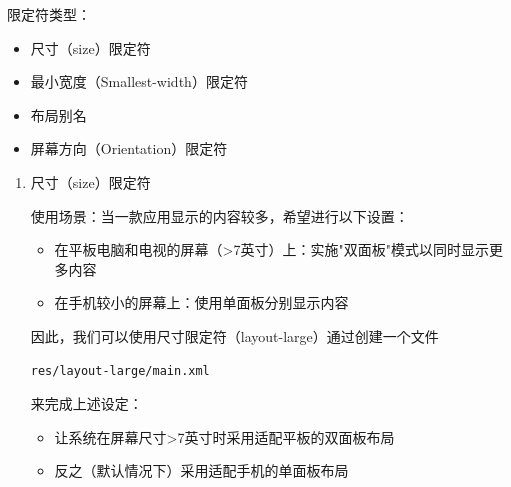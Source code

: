 \documentclass[9pt, b5paper]{article}
\begin{document}
\begin{enumerate}
\begin{enumerate}
限定符类型：
\begin{itemize}
\item 尺寸（size）限定符
\item 最小宽度（Smallest-width）限定符
\item 布局别名
\item 屏幕方向（Orientation）限定符
\end{itemize}

\begin{enumerate}
\item 尺寸（size）限定符
\label{sec-6-6-1-1-2-1}

使用场景：当一款应用显示的内容较多，希望进行以下设置：
\begin{itemize}
\item 在平板电脑和电视的屏幕（>7英寸）上：实施"双面板"模式以同时显示更多内容
\item 在手机较小的屏幕上：使用单面板分别显示内容
\end{itemize}

因此，我们可以使用尺寸限定符（layout-large）通过创建一个文件

\begin{verbatim}
res/layout-large/main.xml
\end{verbatim}

来完成上述设定：
\begin{itemize}
\item 让系统在屏幕尺寸>7英寸时采用适配平板的双面板布局
\item 反之（默认情况下）采用适配手机的单面板布局
\end{itemize}


\end{enumerate}
\end{enumerate}
\end{enumerate}
\end{document}

